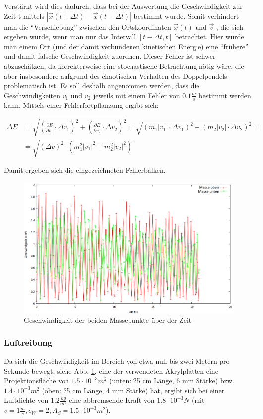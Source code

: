 Verstärkt wird dies dadurch, dass bei der Auswertung die Geschwindigkeit zur Zeit t mittels $ |\vec{x}(t+\Delta t) - \vec{x}(t-\Delta t)| $ bestimmt wurde. Somit verhindert man die \enquote{Verschiebung} zwischen den Ortskoordinaten $  \vec{x} (t) $ und $ \vec{v} $ , die sich ergeben würde, wenn man nur das Intervall $ [t - \Delta t, t] $ betrachtet. Hier würde man einem Ort (und der damit verbundenen kinetischen Energie) eine \enquote{frühere} und damit falsche Geschwindigkeit zuordnen. 
Dieser Fehler ist schwer abzuschätzen, da korrekterweise eine stochastische Betrachtung nötig wäre, die aber insbesondere aufgrund des chaotischen Verhalten des Doppelpendels problematisch ist. 
Es soll deshalb angenommen werden, dass die Geschwindigkeiten $ v_1 $ und $ v_2 $ jeweils mit einem Fehler von $ 0.1 \frac{m}{s} $ bestimmt werden kann. Mittels einer Fehlerfortpflanzung ergibt sich: 

\begin{align}
\Delta E &= \sqrt{(\frac{\partial E}{\partial v_1} \cdot \Delta v_1)^2 + (\frac{\partial E}{\partial v_2} \cdot \Delta v_2)^2} = \sqrt{(m_1 |v_1| \cdot \Delta v_1)^2 + (m_2 |v_2| \cdot \Delta v_2)^2}= \nonumber \\ &= \sqrt{(\Delta v)^2 \cdot (m_1^2 |v_1|^2 + m_2^2 |v_2|^2)}
\end{align}

Damit ergeben sich die eingezeichneten Fehlerbalken. 


\begin{figure}
        \includegraphics[width=.9\textwidth]{images/v_ueber_t_neu.png}
\caption{Geschwindigkeit der beiden Massepunkte über der Zeit}
\label{v_ueber_t}
\end{figure}


\subsubsection{Luftreibung}
Da sich die Geschwindigkeit im Bereich von etwa null bis zwei Metern pro Sekunde bewegt, siehe Abb. \ref{v_ueber_t}, eine der verwendeten Akrylplatten eine Projektionsfläche von $ 1.5 \cdot 10^{-3} m^2$ (unten: 25 cm Länge, 6 mm Stärke) bzw. $ 1.4 \cdot 10^{-3} m^2$ (oben: 35 cm Länge, 4 mm Stärke) hat, ergibt sich bei einer Luftdichte von $ 1.2 \frac{kg}{m^2} $ eine abbremsende Kraft von $ 1.8 \cdot 10^{-3} N $ (mit $ v = 1 \frac{m}{s}, c_W = 2, A_S = 1.5 \cdot 10^{-3} m^2 $). 

